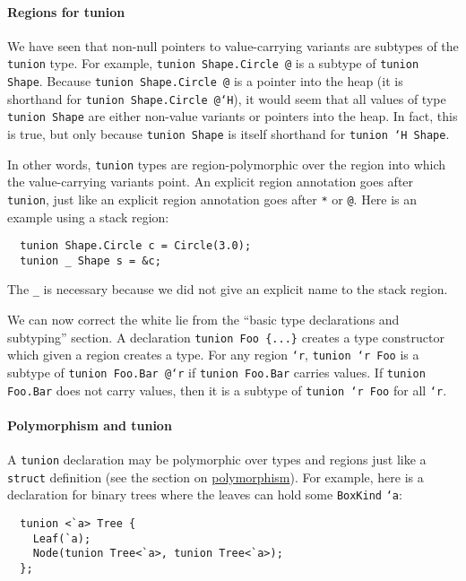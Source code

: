 \paragraph{Regions for tunion} We have seen that non-null pointers to
value-carrying variants are subtypes of the \texttt{tunion} type.  For
example, \texttt{tunion Shape.Circle @} is a subtype of
\texttt{tunion Shape}.  Because \texttt{tunion Shape.Circle @} is a
pointer into the heap (it is shorthand for
\texttt{tunion Shape.Circle @`H}),
it would seem that all values of type \texttt{tunion Shape} are either
non-value variants or pointers into the heap.  In fact, this is true,
but only because \texttt{tunion Shape} is itself shorthand for
\texttt{tunion `H Shape}.

In other words, \texttt{tunion} types are region-polymorphic over the region
into which the value-carrying variants point.  An explicit region
annotation goes after \texttt{tunion}, just like an explicit region annotation
goes after \texttt{*} or \texttt{@}.  Here is an example using a stack
region:
\begin{verbatim}
  tunion Shape.Circle c = Circle(3.0);
  tunion _ Shape s = &c;
\end{verbatim}

The \texttt{_} is necessary because we did not give an explicit name to
the stack region.

We can now correct the white lie from the ``basic type declarations and
subtyping'' section.  A declaration \verb|tunion Foo {...}| creates a
type constructor which given a region creates a type.  For any region
\texttt{`r}, \texttt{tunion `r Foo} is a subtype of
\texttt{tunion Foo.Bar @`r} if \texttt{tunion Foo.Bar} carries values.  If
\texttt{tunion Foo.Bar} does not carry values, then it is a subtype of
\texttt{tunion `r Foo} for all \texttt{`r}.

\paragraph{Polymorphism and tunion} A \texttt{tunion} declaration may be
polymorphic over types and regions just like a \texttt{struct}
definition (see the section on
\hyperlink{polymorphism}{polymorphism}).  For example, here is a
declaration for binary trees where the leaves can hold some
\texttt{BoxKind} \texttt{`a}:
\begin{verbatim}
  tunion <`a> Tree {
    Leaf(`a);
    Node(tunion Tree<`a>, tunion Tree<`a>);
  };
\end{verbatim}

